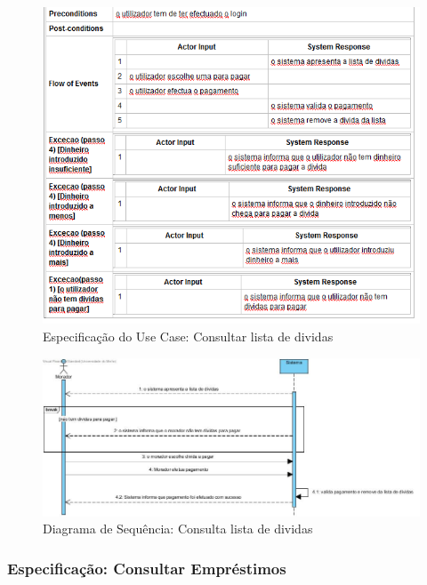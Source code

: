 \begin{figure}[htb!]
	\centering
	\includegraphics[scale=0.7]{imagens/Especificacoes/consultarlistadedividas}  
	\caption{Especificação do Use Case: Consultar lista de dividas}  
\end{figure}


\begin{figure}[htb!]
	\centering
	\includegraphics[scale=0.6]{imagens/diagramaSeq/ConsultaListaDividas}  
	\caption{Diagrama de Sequência: Consulta lista de dividas}  
\end{figure}

\newpage


\subsubsection{Especificação: Consultar Empréstimos }

